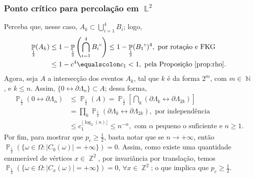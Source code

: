 \documentclass[9pt]{beamer}
\theoremstyle{definition} %
\DeclareMathOperator{\PX}{\mathbb{P}} %
\DeclareMathOperator{\NX}{\mathbb{N}} %
\DeclareMathOperator{\ZX}{\mathbb{Z}} %
\DeclareMathOperator{\LX}{\mathbb{L}} %
\begin{document}
	\begin{frame}[t]
	\frametitle{Ponto crítico para percolação em $\LX^2$}
		\vspace{-6pt}
		Perceba que, nesse caso, $A_k \subset \bigcup_{i = 1}^4 B_i$; logo,
		\begin{align*}
		\PX_{\frac{1}{2}}(A_k) &\leq 1 - \PX_{\frac{1}{2}}\left(\bigcap_{i = 1}^4{B_i}^c\right) \leq 1 - \PX_{\frac{1}{2}}({B_1}^c)^4, \text{ por rotação e FKG} \\
		&\leq 1 - c^4 \equalscolon c_1 < 1, \text{ pela Proposição \ref{prop:rho}}.
		\end{align*}\pause
		Agora, seja $A$ a intersecção dos eventos $A_k$, tal que $k$ é da forma $2^m$, com $m \in \NX$, e $k \leq n$. Assim, $\{0 \leftrightarrow \partial\Lambda_n\} \subset A$; dessa forma,
		\begin{align*}
		\PX_{\frac{1}{2}}(0 \leftrightarrow \partial\Lambda_n) &\leq \PX_{\frac{1}{2}}(A) = \PX_{\frac{1}{2}}\left[\bigcap_{k}(\partial\Lambda_k \leftrightarrow \partial\Lambda_{2k})\right] \\
		&= \prod_{k}\PX_{\frac{1}{2}}(\partial\Lambda_k \leftrightarrow \partial\Lambda_{2k}), \text{ por independência} \\
		&\leq c_1^{\lfloor\log_2(n)\rfloor} \leq n^{-\alpha}, \text{ com $\alpha$ pequeno o suficiente e $n \geq 1$.}
		\end{align*}\pause
		\vspace{1pt}Por fim, para mostrar que $p_c \geq \frac{1}{2}$, basta notar que  se $n \rightarrow +\infty$, então $\PX_{\frac{1}{2}}(\{\omega \in \Omega : |C_0(\omega)| = +\infty\}) = 0$. Assim, como existe uma quantidade enumerável de vértices $x \in \ZX^2$, por invariância por translação, temos $\PX_{\frac{1}{2}}(\{\omega \in \Omega : |C_x(\omega)| = +\infty\}) = 0$, $\forall x \in \ZX^2$; o que implica que $p_c \geq \frac{1}{2}$.
	\end{frame}
\end{document}

